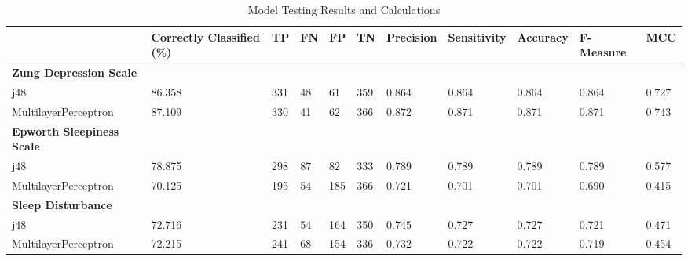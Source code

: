 \documentclass[10pt,conference,a4paper]{IEEEtran}
\begin{document}
\begin{table}[ht]
\centering
\begin{tabular}{@{}lllllllllll@{}}
\toprule
                                    & Correctly Classified (\%) & TP     & FN     & FP     & TN     & Precision & Sensitivity & Accuracy & F-Measure & MCC   \\ \midrule
\textbf{Zung Depression Scale}      &                           &        &        &        &        &           &             &          &           &       \\
\rowcolor[HTML]{EFEFEF} 
j48                                 & 86.358                    & 331    & 48     & 61     & 359    & 0.864     & 0.864       & 0.864    & 0.864     & 0.727 \\
\rowcolor[HTML]{EFEFEF} 
MultilayerPerceptron                & 87.109                    & 330    & 41     & 62     & 366    & 0.872     & 0.871       & 0.871    & 0.871     & 0.743 \\
\textbf{Epworth Sleepiness Scale}   &                           &        &        &        &        &           &             &          &           &       \\
\rowcolor[HTML]{EFEFEF} 
j48                                 & 78.875                    & 298    & 87     & 82     & 333    & 0.789     & 0.789       & 0.789    & 0.789     & 0.577 \\
\rowcolor[HTML]{EFEFEF} 
MultilayerPerceptron                & 70.125                    & 195    & 54     & 185    & 366    & 0.721     & 0.701       & 0.701    & 0.690     & 0.415 \\
\textbf{Sleep Disturbance}          &                           &        &        &        &        &           &             &          &           &       \\
\rowcolor[HTML]{EFEFEF} 
j48                                 & 72.716                    & 231    & 54     & 164    & 350    & 0.745     & 0.727       & 0.727    & 0.721     & 0.471 \\
\rowcolor[HTML]{EFEFEF} 
MultilayerPerceptron                & 72.215                    & 241    & 68     & 154    & 336    & 0.732     & 0.722       & 0.722    & 0.719     & 0.454 \\
\bottomrule
\end{tabular}
\caption{Model Testing Results and Calculations}
\label{tab:results}
\end{table}
\end{document}
